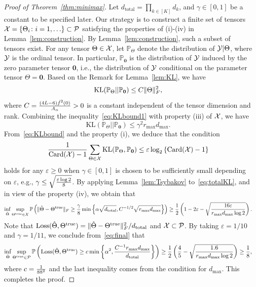 \documentclass{article}
\theoremstyle{plain}
\theoremstyle{definition}
\begin{document}
\begin{proof}[Proof of Theorem~\ref{thm:minimax}]

Let $d_{\text{total}}=\prod_{k\in[K]}d_k$, and $\gamma\in[0,1]$ be a constant to be specified later.  Our strategy is to construct a finite set of tensors $\mathcal{X}=\{\Theta_i\colon i=1,\ldots \}\subset \mathcal{P}$ satisfying the properties of (i)-(iv) in Lemma~\ref{lem:construction}. By Lemma~\ref{lem:construction}, such a subset of tensors exist. For any tensor  $\Theta\in\mathcal{X}$, let $\mathbb{P}_{\Theta}$ denote the distribution of $\mathcal{Y}|\Theta$, where $\mathcal{Y}$ is the ordinal tensor. In particular, $\mathbb{P}_{\mathbf{0}}$ is the distribution of $\mathcal{Y}$ induced by the zero parameter tensor $\mathbf{0}$, i.e., the distribution of $\mathcal{Y}$ conditional on the parameter tensor $\Theta=\mathbf{0}$. Based on the Remark for Lemma~\ref{lem:KL}, we have
\begin{equation}\label{eq:KLbound1}
\mathrm{KL}(\mathbb{P}_{\Theta}|| \mathbb{P}_{\mathbf{0}})\leq C \lVert\Theta\rVert_F^2,
\end{equation}
where $C={(4L-6) \dot{f}^2(0)\over  A_\alpha}>0$ is a constant independent of the tensor dimension and rank.
Combining the inequality~\eqref{eq:KLbound1} with property (iii) of $\mathcal{X}$, we have
\begin{equation}\label{eq:KLbound}
\text{KL}(\mathbb{P}_{\Theta}||\mathbb{P}_{\mathbf{0}})\leq \gamma^2 r_{\max} d_{\max}.
\end{equation}
From~\eqref{eq:KLbound} and the property (i), we deduce that the condition
\begin{equation}\label{eq:totalKL}
{1\over \text{Card}(\mathcal{X})-1}\sum_{\Theta \in\mathcal{X}}\text{KL}(\mathbb{P}_{\Theta}, \mathbb{P}_{\mathbf{0}})\leq \varepsilon \log_2\left\{\text{Card}(\mathcal{X})-1 \right\}
\end{equation}
holds for any $ \varepsilon \geq 0$ when $\gamma\in[0,1]$ is chosen to be sufficiently small depending on $\varepsilon$, e.g., $\gamma \leq \sqrt{\varepsilon\log2\over8}$. By applying Lemma~\ref{lem:Tsybakov} to~\eqref{eq:totalKL}, and in view of the property (iv), we obtain that
\begin{equation}\label{eq:final}
\inf_{\hat \Theta}\sup_{\Theta^{\mathrm{true}}\in \mathcal{X}}\mathbb{P}\left(\lVert\hat \Theta- \Theta^{\mathrm{true}}\rVert_F\geq  {\gamma\over 8} \min\left\{ \alpha\sqrt{d_{\text{total}}}, C^{-1/2}\sqrt{ r_{\max}d_{\max}}\right\} \right)\geq {1\over 2}\left(1-2\varepsilon-\sqrt{16 \varepsilon \over r_{\max}d_{\max}\log2}\right).
\end{equation}
Note that $\text{Loss}(\hat \Theta, \Theta^{\mathrm{true}})=\lVert\hat \Theta- \Theta^{\mathrm{true}}\rVert_F^2/d_{\text{total}}$ and $\mathcal{X}\subset \mathcal{P}$. By taking $\varepsilon=1/10$ and $\gamma=1/11$, we conclude from~\eqref{eq:final} that
\begin{equation}\label{eq:prob}
\inf_{\hat \Theta}\sup_{\Theta^{\mathrm{true}}\in \mathcal{P}}\mathbb{P}\left(\text{Loss}(\hat \Theta, \Theta^{\mathrm{true}})\geq c\min\left \{ \alpha^2,  {C^{-1}r_{\max}d_{\max}\over d_{\text{total}}}\right \}\right)\geq {1\over 2}\left({4\over 5}- \sqrt{1.6\over r_{\max}d_{\max}\log2} \right)\geq {1\over 8},
\end{equation}
where $c = {1 \over 88^2}$ and the last inequality comes from the condition for $d_{\text{max}}$.
This completes the proof.
\end{proof}
\end{document}
